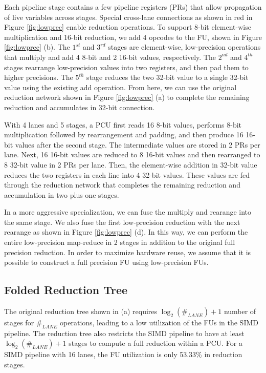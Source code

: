 Each pipeline stage contains a few pipeline registers (PRs)
  that allow propagation of live variables across stages.
Special cross-lane connections as shown in red in Figure \ref{fig:lowprec} enable reduction operations.
To support 8-bit element-wise multiplication and 16-bit reduction, we add 4 opcodes to the FU, shown in
Figure \ref{fig:lowprec} (b).
The $1^{st}$ and $3^{rd}$ stages are element-wise, low-precision operations
  that multiply and add 4 8-bit and 2 16-bit values, respectively.
The $2^{nd}$ and $4^{th}$ stages rearrange low-precision values into two registers,
  and then pad them to higher precisions.
The $5^{th}$ stage reduces the two 32-bit value to a single 32-bit value using the existing add operation. 
From here, we can use the original
reduction network shown in Figure \ref{fig:lowprec} (a) to complete the remaining reduction and accumulates
in 32-bit connection.

With 4 lanes and 5 stages,
  a PCU first reads 16 8-bit values,
  performs 8-bit multiplication followed by rearrangement and padding,
  and then produce 16 16-bit values after the second stage.
The intermediate values are stored in 2 PRs per lane.
Next, 16 16-bit values are reduced to 8 16-bit values
  and then rearranged to 8 32-bit value in 2 PRs per lane.
Then, the element-wise addition in 32-bit value
  reduces the two registers in each line into 4 32-bit values.
These values are fed through the
  reduction network that completes the remaining
  reduction and accumulation in two plus one stages.

In a more aggressive specialization,
  we can fuse the multiply and rearange into the same stage.
We also fuse the first low-precision reduction with the next rearange as shown in Figure \ref{fig:lowprec} (d).
In this way, we can perform the entire low-precision map-reduce in 2 stages
  in addition to the original full precision reduction.
In order to maximize hardware reuse,
  we assume that it is possible to construct a full precision FU
  using low-precision FUs.

\subsection{Folded Reduction Tree} \label{sec:foldrt}
The original reduction tree shown in  (a) requires $\log_2(\#_{LANE})+1$ number of
stages for $\#_{LANE}$ operations, leading to a low utilization of the FUs in the SIMD pipeline.
The reduction tree also restricts the SIMD pipeline to have at least 
$\log_2(\#_{LANE})+1$ stages to compute a full reduction within a PCU.
For a SIMD pipeline with 16 lanes, the FU utilization is only 53.33\% in reduction stages.

